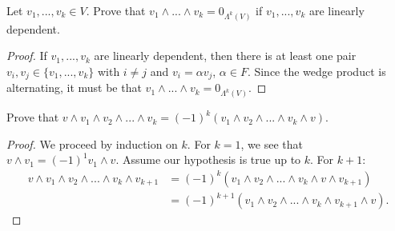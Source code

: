 \documentclass[10pt,twoside,openany]{memoir}
\begin{document}
    \begin{exercise}
        Let $v_1,...,v_k \in V$. Prove that $v_1 \wedge ... \wedge v_k = 0_{\Lambda^k(V)}$ if $v_1,...,v_k$ are linearly dependent.
    \end{exercise}
        \begin{proof}
            If $v_1,...,v_k$ are linearly dependent, then there is at least one pair $v_i, v_j \in \{v_1,...,v_k\}$ with $i \neq j$ and $v_i = \alpha v_j$, $\alpha \in F$. Since the wedge product is alternating, it must be that $v_1 \wedge ... \wedge v_k = 0_{\Lambda^k(V)}$.
        \end{proof}
    \begin{exercise}
        Prove that $v \wedge v_1 \wedge v_2 \wedge ... \wedge v_k = (-1)^k(v_1 \wedge v_2 \wedge ... \wedge v_k \wedge v)$.
    \end{exercise}
        \begin{proof}
            We proceed by induction on $k$. For $k = 1$, we see that $v \wedge v_1 = (-1)^1 v_1 \wedge v$. Assume our hypothesis is true up to $k$. For $k+1$:
                \begin{equation*}
                \begin{split}
                    v \wedge v_1 \wedge v_2 \wedge ... \wedge v_k \wedge v_{k+1}
                    & = (-1)^k(v_1 \wedge v_2 \wedge ... \wedge v_k \wedge v \wedge v_{k+1}) \\
                    & = (-1)^{k+1}(v_1 \wedge v_2 \wedge ... \wedge v_k \wedge v_{k+1} \wedge v).
                \end{split}
                \end{equation*}
        \end{proof}
\end{document}
